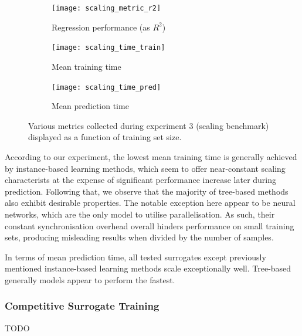 \begin{figure}[h]
	\centering
	\begin{subfigure}[b]{0.333\textwidth}
		\centering
		\texttt{[image: scaling\_metric\_r2]}
		\caption{Regression performance (as $R^2$)}
	\end{subfigure}\hfill%
	\begin{subfigure}[b]{0.333\textwidth}
		\centering
		\texttt{[image: scaling\_time\_train]}
		\caption{Mean training time}
	\end{subfigure}\hfill%
	\begin{subfigure}[b]{0.333\textwidth}
		\centering
		\texttt{[image: scaling\_time\_pred]}
		\caption{Mean prediction time}
	\end{subfigure}
	\caption{Various metrics collected during experiment 3 (scaling
	benchmark) displayed as a function of training set size.}
	\label{fig:scaling}
\end{figure}

According to our experiment, the lowest mean training time is generally achieved
by instance-based learning methods, which seem to offer near-constant scaling
characterists at the expense of significant performance increase later during
prediction. Following that, we observe that the majority of tree-based methods also exhibit
desirable properties. The notable exception here appear to be neural networks,
which are the only model to utilise parallelisation. As such, their constant
synchronisation overhead overall hinders performance on small training sets,
producing misleading results when divided by the number of samples.

In terms of mean prediction time, all tested surrogates except previously mentioned
instance-based learning methods scale exceptionally well. Tree-based generally
models appear to perform the fastest.


\subsubsection{Competitive Surrogate Training}

TODO

